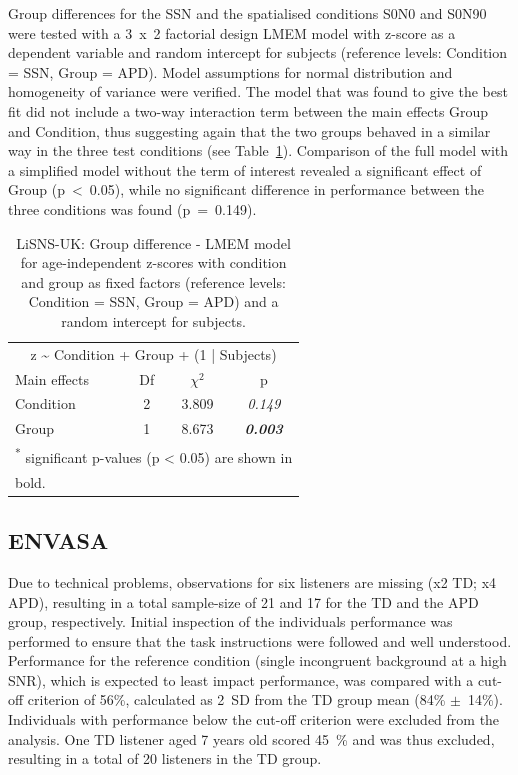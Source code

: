\documentclass[a4paper, twoside]{templates/ociamthesis}
\begin{document}
Group differences for the SSN and the spatialised conditions S0N0 and S0N90 were tested with a 3~x~2 factorial design LMEM model with z-score as a dependent variable and random intercept for subjects (reference levels: Condition = SSN, Group = APD). Model assumptions for normal distribution and homogeneity of variance were verified. The model that was found to give the best fit did not include a two-way interaction term between the main effects Group and Condition, thus suggesting again that the two groups behaved in a similar way in the three test conditions (see Table~\ref{tab:LiSNS-zLMEMTab}). Comparison of the full model with a simplified model without the term of interest revealed a significant effect of Group (p~\textless~0.05), while no significant difference in performance between the three conditions was found (p~=~0.149).\\

\begin{table}

\caption{\label{tab:LiSNS-zLMEMTab}LiSNS-UK: Group difference - LMEM model for age-independent z-scores with condition and group as fixed factors (reference levels: Condition = SSN, Group = APD) and a random intercept for subjects.}
\centering
\begin{tabular}[t]{lcc>{}c}
\toprule
\multicolumn{4}{c}{z \textasciitilde{} Condition + Group + (1 | Subjects)} \\
\cmidrule(l{3pt}r{3pt}){1-4}
Main effects & Df & $\chi^{2}$ & p\\
\midrule
Condition & 2 & 3.809 & \em{0.149}\\
Group & 1 & 8.673 & \em{\textbf{0.003}}\\
\bottomrule
\multicolumn{4}{l}{\textsuperscript{*} significant p-values (p < 0.05) are shown in}\\
\multicolumn{4}{l}{bold.}\\
\end{tabular}
\end{table}

\hypertarget{envasa}{%
\subsection{ENVASA}\label{envasa}}

Due to technical problems, observations for six listeners are missing (x2 TD; x4 APD), resulting in a total sample-size of 21 and 17 for the TD and the APD group, respectively. Initial inspection of the individuals performance was performed to ensure that the task instructions were followed and well understood. Performance for the reference condition (single incongruent background at a high SNR), which is expected to least impact performance, was compared with a cut-off criterion of 56\%, calculated as 2~SD from the TD group mean (84\% \(\pm\)~14\%). Individuals with performance below the cut-off criterion were excluded from the analysis. One TD listener aged 7 years old scored 45~\% and was thus excluded, resulting in a total of 20 listeners in the TD group.
\end{document}
